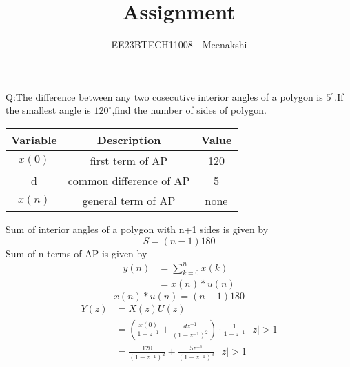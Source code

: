 \documentclass[journal,12pt,twocolumn]{IEEEtran}
\theoremstyle{remark}
\begin{document}
\let\vec\mathbf



\vspace{3cm}
\title{Assignment}
\author{EE23BTECH11008 - Meenakshi}
\maketitle
\newpage
\bigskip

\renewcommand{\thefigure}{\theenumi}
\renewcommand{\thetable}{\theenumi}
Q:The difference between any two cosecutive interior angles of a polygon is $5^\circ$.If the smallest angle is $120^\circ$,find the number of sides of polygon.
\\\solution
\begin{table}[ht]
  \centering
  \begin{tabular}{|c|c|c|}
    \hline
      \textbf{Variable}& \textbf{Description}& \textbf{Value}\\\hline
    $x(0)$& first term of AP& 120  \\\hline
    d& common difference of AP & 5\\\hline
    $x(n)$ & general  term of AP&none\\\hline
  \end{tabular}
  \end {table}
Sum of interior angles of a polygon with n+1 sides is given by
\begin{equation}
    S=(n-1)180
\end{equation}
Sum of n terms of AP is given by
\begin{align}
    y(n)&=\sum_{k=0}^{n} x(k)\\
    &=x(n)*u(n)
\end{align}
\begin{equation}
    x(n)*u(n)=(n-1)180
\end{equation}
\begin{align}
    Y(z) &= X(z)U(z) \\
    &= \left(\frac{x(0)}{1-z^{-1}} + \frac{dz^{-1}}{(1-z^{-1})^2}\right)\cdot \frac{1}{1-z^{-1}}\hspace{5pt} |z|>1\\
    &=\frac{120}{(1-z^{-1})^2} + \frac{5z^{-1}}{(1-z^{-1})^3}\hspace{5pt} |z|>1
\end{align}
\end{document}
